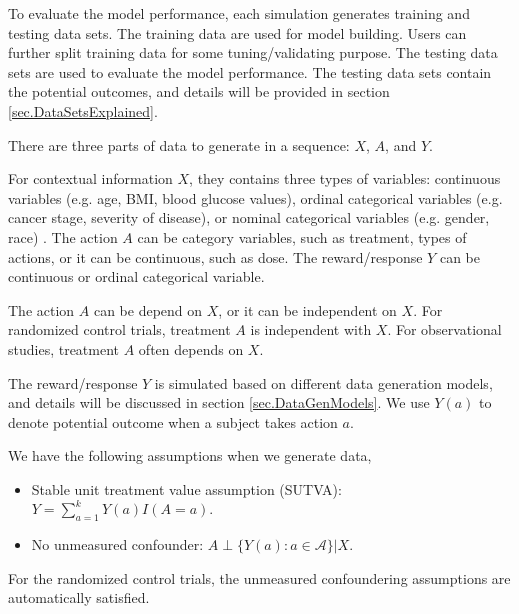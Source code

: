 \documentclass[12pt]{article}
\def\cal{\mathcal}
\begin{document}
To evaluate the model performance, each simulation generates training and testing data sets. The training data are used for model building. Users can further split training data for some tuning/validating purpose. The testing data sets are used to evaluate the model performance. The testing data sets contain the potential outcomes, and details will be provided in section \ref{sec.DataSetsExplained}.

There are three parts of data to generate in a sequence: $X$, $A$, and $Y$.  

For contextual information $X$, they contains three types of variables: continuous variables (e.g. age, BMI, blood glucose values), ordinal categorical variables (e.g. cancer stage, severity of disease), or nominal categorical variables (e.g. gender, race) . The action $A$ can be category variables, such as treatment, types of actions, or it can be continuous, such as dose. The reward/response $Y$ can be continuous or ordinal categorical variable.

The action $A$ can be depend on $X$, or it can be independent on $X$. For randomized control trials, treatment $A$ is independent with $X$. For observational studies, treatment $A$ often depends on $X$.

The reward/response $Y$ is simulated based on different data generation models, and details will be discussed in section \ref{sec.DataGenModels}. We use $Y(a)$ to denote potential outcome when a subject takes action $a$. 

We have the following assumptions when we generate data,
\begin{itemize}
	\item Stable unit treatment value assumption (SUTVA): $Y=\sum_{a=1}^k Y(a)I(A=a)$.
	\item No unmeasured confounder: $A \perp \{Y(a): a \in {\cal A} \} | X $.
\end{itemize}
For the randomized control trials, the unmeasured confoundering assumptions are automatically satisfied. 
\end{document}
